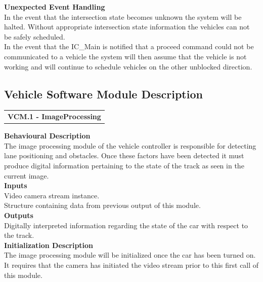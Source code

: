 \documentclass [10pt]{article}
\begin{document}
\textbf{Unexpected Event Handling}\\
In the event that the intersection state becomes unknown the system will be halted. Without appropriate intersection state information the vehicles can not be safely scheduled. \\
In the event that the IC\_Main is notified that a proceed command could not be communicated to a vehicle the system will then assume that the vehicle is not working and will continue to schedule vehicles on the other unblocked direction. \\



\subsection{Vehicle Software Module Description}


\begin{longtable}{p{}}
\rowcolor{tableCell}\textbf{VCM.1 - ImageProcessing} \\
\end{longtable}



\textbf{Behavioural Description} \\
    The image processing module of the vehicle controller is responsible for detecting lane positioning and obstacles. Once these factors have been detected it must produce
    digital information pertaining to the state of the track as seen in the current image.
    \\

\textbf{Inputs} \\
    Video camera stream instance.\\
    Structure containing data from previous output of this module.\\
    
    

\textbf{Outputs} \\
    Digitally interpreted information regarding the state of the car with respect to the track. \\

\textbf{Initialization Description} \\
    The image processing module will be initialized once the car has been turned on. It requires that the camera has initiated the video stream prior to this first call of this module.
    \\
\end{document}
